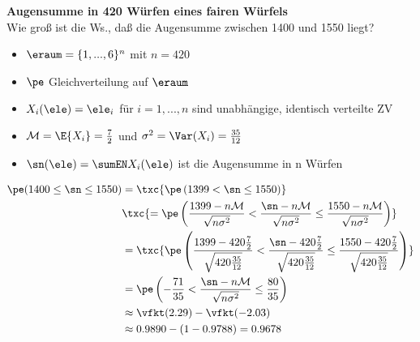 \begin{bsp}
    \textbf{Augensumme in 420 Würfen eines fairen Würfels}  \\
    Wie groß ist die Ws., daß die Augensumme zwischen 1400 und 1550 liegt? \\
    \begin{itemize}
        \item $\eraum = \{1, ... , 6\}^n$ mit $n = 420$
        \item $\pe$ Gleichverteilung auf $\eraum$
        \item $X_i(\ele) = \ele_i$ für $i = 1, . . . , n$ sind unabhängige, identisch verteilte ZV
        \item $\mathcal{M} = \E{X_i} = \frac{7}{2}$ und $\sigma^2 = \Var(X_i) = \frac{35}{12}$
        \item $\sn (\ele) = \sumEN X_i(\ele)$ ist die Augensumme in n Würfen
    \end{itemize}
    \begin{align*}
        \pe(1400 \leq \sn \leq 1550) & = \txc{\pe \left( 1399 <   \sn \leq 1550 \right)} \\
        &
        \txc{= \pe \left(  \frac{1399 - n \mathcal{M}}{\sqrt{n \sigma^2}}  < 
        \frac{\sn - n \mathcal{M}}{\sqrt{n \sigma^2}}  \leq \frac{1550 - n \mathcal{M} }{\sqrt{n \sigma^2}} \right)  } \\
        & = \txc{\pe \left(  \frac{1399 - 420 \frac{7}{2}}{\sqrt{420 \frac{35}{12}}}  <
                         \frac{\sn - 420 \frac{7}{2}}{\sqrt{420 \frac{35}{12}}}  \leq \frac{1550 - 420 \frac{7}{2} }{\sqrt{420 \frac{35}{12}}} \right)} \\
        & = \pe \left(  - \frac{71}{35} < \frac{\sn - n \mathcal{M}}{\sqrt{n \sigma^2}} \leq \frac{80}{35}  \right) \\
        & \approx \vfkt(2.29) - \vfkt(-2.03) \\
        & \approx 0.9890 - (1 - 0.9788) = 0.9678
    \end{align*}
\end{bsp}

